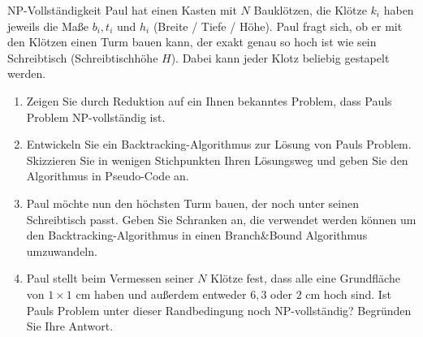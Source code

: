\documentclass{article}
\begin{document}
\begin{exercise}{NP-Vollständigkeit}
  Paul hat einen Kasten mit $N$ Bauklötzen, die Klötze $k_i$ haben jeweils die Maße $b_i, t_i$ und $h_i$ (Breite / Tiefe / Höhe). Paul fragt sich, ob er mit den Klötzen einen Turm bauen kann, der exakt genau so hoch ist wie sein Schreibtisch (Schreibtischhöhe $H$). Dabei kann jeder Klotz beliebig gestapelt werden.
  \begin{enumerate}
    \item Zeigen Sie durch Reduktion auf ein Ihnen bekanntes Problem, dass Pauls Problem NP-vollständig ist.
    \item Entwickeln Sie ein Backtracking-Algorithmus zur Lösung von Pauls Problem. Skizzieren Sie in wenigen Stichpunkten Ihren Lösungsweg und geben Sie den Algorithmus in Pseudo-Code an.
    \item Paul möchte nun den höchsten Turm bauen, der noch unter seinen Schreibtisch passt. Geben Sie Schranken an, die verwendet werden können um den Backtracking-Algorithmus in einen Branch\&Bound Algorithmus umzuwandeln.
    \item Paul stellt beim Vermessen seiner $N$ Klötze fest, dass alle eine Grundfläche von $1 \times 1$ cm haben und außerdem entweder $6, 3$ oder $2$ cm hoch sind. Ist Pauls Problem unter dieser Randbedingung noch NP-vollständig? Begründen Sie Ihre Antwort.
  \end{enumerate}

  \begin{solution}

  \end{solution}
\end{exercise}
\end{document}
